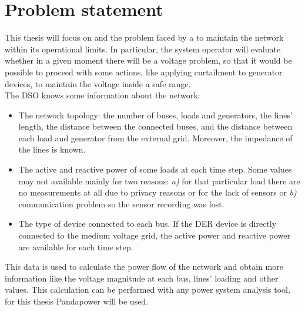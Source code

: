 \section{Problem statement}
\label{sec:ps}
This thesis will focus on  and the problem faced by a  to maintain the network within its operational limits. In particular, the system operator will evaluate whether in a given moment there will be a voltage problem, so that it would be possible to proceed with some actions, like applying curtailment to generator devices, to maintain the voltage inside a safe range.\\

The \gls{DSO} knows some information about the network:
\begin{itemize}
    \item The network topology: the number of buses, loads and generators, the lines' length, the distance between the connected buses, and the distance between each load and generator from the external grid. Moreover, the impedance of the lines is known.
    
    \item The active and reactive power of some loads at each time step. Some values may not available mainly for two reasons: \emph{a)} for that particular load there are no measurements at all due to privacy reasons or for the lack of sensors or \emph{b)} communication problem so the sensor recording was lost.
    
    \item The type of  device connected to each bus. If the \gls{DER} device is directly connected to the medium voltage grid, the active power and reactive power are available for each time step. 
\end{itemize}

This data is used to calculate the power flow of the network and obtain more information like the voltage magnitude at each bus, lines' loading and other values. This calculation can be performed with any power system analysis tool, for this thesis Pandapower will be used.\\


